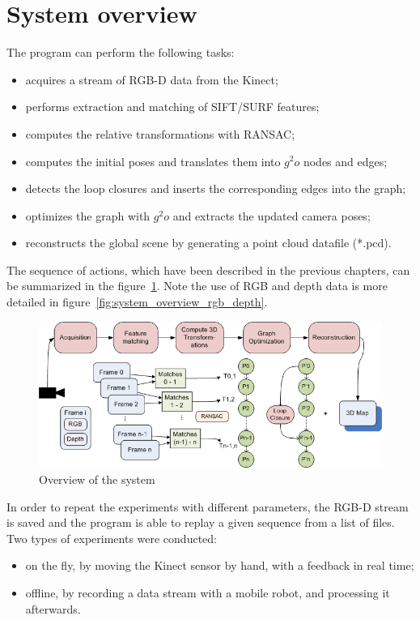 \section{System overview}

The program can perform the following tasks:

\begin{itemize}
\item acquires a stream of RGB-D data from the Kinect;
\item performs extraction and matching of SIFT/SURF features;
\item computes the relative transformations with \gls{RANSAC};
\item computes the initial poses and translates them into $g^2o$ nodes and edges;
\item detects the loop closures and inserts the corresponding edges into the graph;
\item optimizes the graph with $g^2o$ and extracts the updated camera poses;
\item reconstructs the global scene by generating a point cloud datafile (*.pcd).
\end{itemize}

The sequence of actions, which have been described in the previous chapters, can be summarized in the figure~\ref{fig:system_overview}. Note the use of RGB and depth data is more detailed in figure~\ref{fig:system_overview_rgb_depth}. 

\clearpage
\begin{figure}[h!]
\begin{center}
\includegraphics[width=1\textwidth]{figures/overview}
\caption{Overview of the system}
\label{fig:system_overview}
\end{center}
\end{figure}

In order to repeat the experiments with different parameters, the RGB-D stream is saved and the program is able to replay a given sequence from a list of files. Two types of experiments were conducted:
\begin{itemize}
\item on the fly, by moving the Kinect sensor by hand, with a feedback in real time;
\item offline, by recording a data stream with a mobile robot, and processing it afterwards. 
\end{itemize}

